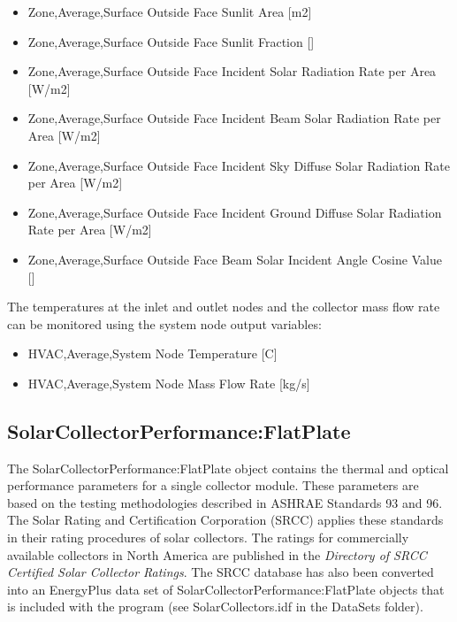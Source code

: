 \begin{itemize}
\item
  Zone,Average,Surface Outside Face Sunlit Area {[}m2{]}
\item
  Zone,Average,Surface Outside Face Sunlit Fraction {[]}
\item
  Zone,Average,Surface Outside Face Incident Solar Radiation Rate per Area {[}W/m2{]}
\item
  Zone,Average,Surface Outside Face Incident Beam Solar Radiation Rate per Area {[}W/m2{]}
\item
  Zone,Average,Surface Outside Face Incident Sky Diffuse Solar Radiation Rate per Area {[}W/m2{]}
\item
  Zone,Average,Surface Outside Face Incident Ground Diffuse Solar Radiation Rate per Area {[}W/m2{]}
\item
  Zone,Average,Surface Outside Face Beam Solar Incident Angle Cosine Value {[]}
\end{itemize}

The temperatures at the inlet and outlet nodes and the collector mass flow rate can be monitored using the system node output variables:

\begin{itemize}
\item
  HVAC,Average,System Node Temperature {[}C{]}
\item
  HVAC,Average,System Node Mass Flow Rate {[}kg/s{]}
\end{itemize}

\subsection{SolarCollectorPerformance:FlatPlate}\label{solarcollectorperformanceflatplate}

The SolarCollectorPerformance:FlatPlate object contains the thermal and optical performance parameters for a single collector module. These parameters are based on the testing methodologies described in ASHRAE Standards 93 and 96. The Solar Rating and Certification Corporation (SRCC) applies these standards in their rating procedures of solar collectors. The ratings for commercially available collectors in North America are published in the \emph{Directory of SRCC Certified Solar Collector Ratings}. The SRCC database has also been converted into an EnergyPlus data set of SolarCollectorPerformance:FlatPlate objects that is included with the program (see SolarCollectors.idf in the DataSets folder).

